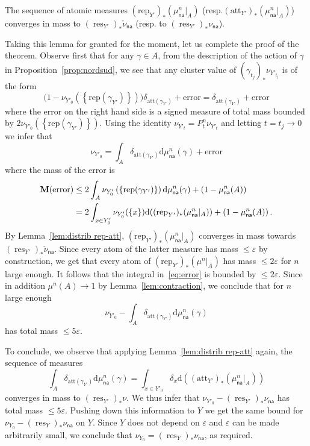 \documentclass[AHL,Unicode,longabstracts]{cedram}
\DeclareMathOperator{\res}{res}
\newcommand{\Rep}{\mathrm{rep}}
\newcommand{\Att}{\mathrm{att}}
\newcommand{\e}{\varepsilon}
\newcommand{\cv}{\rightarrow}
\newcommand{\set}[1]{\left\{#1\right\}}
\newcommand{\m}{\textbf{M}}
\newcommand{\lrpar}[1]{\left(#1\right)}
\newcommand{\att}{\mathrm{att}}
\newcommand{\rep}{\mathrm{rep}}
\newcommand{\na}{\mathsf{na}}
\newcommand*{\dd}{\mathrm{d}}
\newcommand*{\dmu}{\dd \mu}
\begin{document}
\begin{lemm}\label{lem:distrib rep-att}
The sequence of atomic measures $(\Rep_{Y'})_*(\mu^n_\na|_{A}) $ (resp.\linebreak $(\Att_{Y'})_*(\mu^n_\na|_{A}) $) converges in mass to $(\res_{Y'})_*\check\nu_\na$ (resp. to $(\res_{Y'})_*\nu_\na$).
\end{lemm}

Taking this lemma for granted for the moment, let us complete the proof of the theorem. Observe first that for any $\gamma \in A$, from the description of the action of $\gamma$ in Proposition~\ref{prop:nordsud}, we see that any cluster value of $(\gamma_{t_j})_*\nu_{Y'_{t_j}}$ is of the form
\[
\big(1- \nu_{Y'_0}\lrpar{\set{\rep(\gamma_{Y'})}}\big) \delta_{\att(\gamma_{Y'})} + \mathrm{error}
=
\delta_{\att(\gamma_{Y'})} + \mathrm{error}
\]
where the error on the right hand side is a signed measure of total mass bounded by $ 2 \nu_{Y'_0}\lrpar{\set{\rep(\gamma_{Y'})}}$. Using the identity $\nu_{Y'_t} = P_t^n\nu_{Y'_t}$ and letting $t=t_j\cv0$ we infer that
\begin{equation}\label{eq:limit stationary}
\nu_{Y'_0} = \int_{A} \delta_{\att(\gamma_{Y'})} \dmu_\na^n(\gamma) + \mathrm{error}
\end{equation}
where the mass of the error is
\begin{align}
\notag \m(\mathrm{error}) & \leq 2 \int_{A} \nu_{Y'_0}\lrpar{\set{\rep(\gamma_{Y'})}} \dmu_\na^n(\gamma) +
\lrpar{1 -\mu_\na^n(A)} \\\label{eq:error}
&= 2 \int_{x\in Y'_0} \nu_{Y'_0}(\{ x \}) \dd \!\left((\Rep_{Y'})_*(\mu_\na^n|_{A})\right)+ \lrpar{1 -\mu_\na^n(A)}.
\end{align}
By Lemma~\ref{lem:distrib rep-att}, $(\Rep_{Y'})_*(\mu_\na^n|_{A})$ converges in mass towards $(\res_{Y'})_*\check\nu_\na$. Since every atom of the latter measure has mass $\le \varepsilon$ by construction, we get that every atom of $(\Rep_{Y'})_*(\mu^n|_{A})$ has mass $\le 2\varepsilon$ for $n$ large enough. It follows that the integral in~\eqref{eq:error} is bounded by $\le 2 \varepsilon$. Since in addition $\mu^n(A) \to 1$ by Lemma~\ref{lem:contraction}, we conclude that for $n$ large enough
\begin{equation}
\nu_{Y'_0} - \int_{A} \delta_{\att(\gamma_{Y'})} \dmu_\na^n(\gamma)
\end{equation}
has total mass $\le 5 \varepsilon$.

To conclude, we observe that applying Lemma~\ref{lem:distrib rep-att} again, the sequence of measures
\[
\int_{A} \delta_{\att(\gamma_{Y'})} \dmu_\na^n(\gamma) = \int_{x\in Y'_0} \delta_x \dd\!\left((\Att_{Y'})_*(\mu_\na^n|_{A})\right)
\]
converges in mass to $(\res_{Y'})_*\nu$. We thus infer that $ \nu_{Y'_0} - (\res_{Y'})_*\nu_\na$ has total mass $\le 5 \varepsilon$. Pushing down this information to $Y$ we get the same bound for $\nu_{Y_0} - (\res_{Y})_*\nu_\na$ on $Y$. Since $Y$ does not depend on $\e$ and $\e$ can be made arbitrarily small, we conclude that $\nu_{Y_0} = (\res_{Y})_*\nu_\na$, as required.
\end{document}
